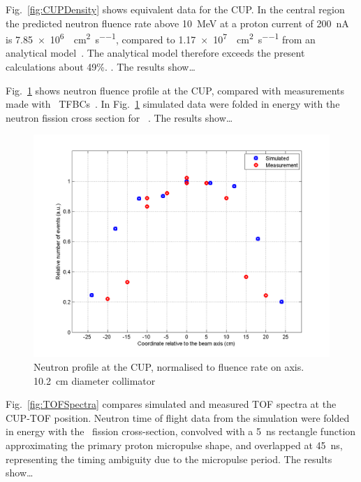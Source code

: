 \documentclass[11pt,a4paper]{IEEEtran}
\let\MYoriglatexcaption\caption
\renewcommand{\caption}[2][\relax]{\MYoriglatexcaption[#2]{#2}}
\def\U238{\BPChem{\^{238}U}}
\begin{document}
Fig.~\ref{fig:CUPDensity} shows equivalent data for the CUP.
In the central region the predicted neutron fluence rate above \SI{10}{\MeV} at a proton current of \SI{200}{\nA} is \SI{7.85e6}{\neutron\per\cm\squared\per\second}, compared to \SI{1.17e7}{\neutron\per\cm\squared\per\second} from an analytical model~\cite{Prokofiev2014}.
The analytical model therefore exceeds the present calculations about 49\%.
.
The results show\ldots
{}

Fig.~\ref{fig:CUPProfile} shows neutron fluence profile at the CUP, compared with measurements made with \U238\ TFBCs~\cite{Prokofiev2014}.
In Fig.~\ref{fig:CUPProfile} simulated data were folded in energy with the neutron fission cross section for \U238~\cite{tbd}.
The results show\ldots
{}

\begin{figure}[t]
    \centering
    \includegraphics[width=\columnwidth]{CUPTOF10beamproRADECS.png}
    \caption{
        Neutron profile at the CUP, normalised to fluence rate on axis.
        \SI{10.2}{\cm} diameter collimator}
    \label{fig:CUPProfile}
\end{figure}

Fig.~\ref{fig:TOFSpectra} compares simulated and measured TOF spectra at the CUP-TOF position.
Neutron time of flight data from the simulation were folded in energy with the \U238\ fission cross-section, convolved with a \SI{5}{\ns} rectangle function approximating the primary proton micropulse shape, and overlapped at \SI{45}{\ns}, representing the timing ambiguity due to the micropulse period.
The results show\ldots
{}
\end{document}
